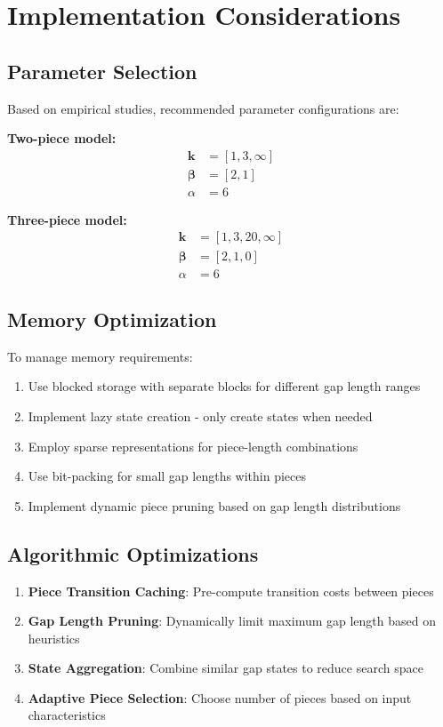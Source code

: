 \documentclass[11pt]{article}
\begin{document}
\section{Implementation Considerations}

\subsection{Parameter Selection}

Based on empirical studies, recommended parameter configurations are:

\textbf{Two-piece model:}
\begin{align}
\mathbf{k} &= [1, 3, \infty] \\
\boldsymbol{\beta} &= [2, 1] \\
\alpha &= 6
\end{align}

\textbf{Three-piece model:}
\begin{align}
\mathbf{k} &= [1, 3, 20, \infty] \\
\boldsymbol{\beta} &= [2, 1, 0] \\
\alpha &= 6
\end{align}

\subsection{Memory Optimization}

To manage memory requirements:
\begin{enumerate}
\item Use blocked storage with separate blocks for different gap length ranges
\item Implement lazy state creation - only create states when needed
\item Employ sparse representations for piece-length combinations
\item Use bit-packing for small gap lengths within pieces
\item Implement dynamic piece pruning based on gap length distributions
\end{enumerate}

\subsection{Algorithmic Optimizations}

\begin{enumerate}
\item \textbf{Piece Transition Caching}: Pre-compute transition costs between pieces
\item \textbf{Gap Length Pruning}: Dynamically limit maximum gap length based on heuristics
\item \textbf{State Aggregation}: Combine similar gap states to reduce search space
\item \textbf{Adaptive Piece Selection}: Choose number of pieces based on input characteristics
\end{enumerate}
\end{document}
